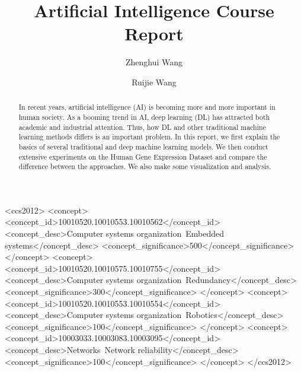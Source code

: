 \documentclass[sigconf]{acmart}
\begin{document}
	\title{Artificial Intelligence Course Report}
	
	
	\author{Zhenghui Wang}
	
	\author{Ruijie Wang}
	
	
	\renewcommand{\shortauthors}{Zhenghui Wang}
	
	
	\begin{abstract}
		In recent years, artificial intelligence (AI) is becoming more and more important in human society. As a booming trend in AI, deep learning (DL) has attracted both academic and industrial attention. Thus, how DL and other traditional machine learning methods differs is an important problem. In this report, we first explain the basics of several traditional and deep machine learning models. We then conduct extensive experiments on the Human Gene Expression Dataset and compare the difference between the approaches. We also make some visualization and analysis.
	
	\end{abstract}
	
	\begin{CCSXML}
		<ccs2012>
		<concept>
		<concept_id>10010520.10010553.10010562</concept_id>
		<concept_desc>Computer systems organization~Embedded systems</concept_desc>
		<concept_significance>500</concept_significance>
		</concept>
		<concept>
		<concept_id>10010520.10010575.10010755</concept_id>
		<concept_desc>Computer systems organization~Redundancy</concept_desc>
		<concept_significance>300</concept_significance>
		</concept>
		<concept>
		<concept_id>10010520.10010553.10010554</concept_id>
		<concept_desc>Computer systems organization~Robotics</concept_desc>
		<concept_significance>100</concept_significance>
		</concept>
		<concept>
		<concept_id>10003033.10003083.10003095</concept_id>
		<concept_desc>Networks~Network reliability</concept_desc>
		<concept_significance>100</concept_significance>
		</concept>
		</ccs2012>  
	\end{CCSXML}
	
\end{document}
